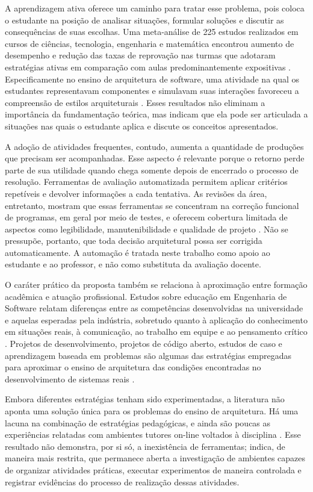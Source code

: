 A aprendizagem ativa oferece um caminho para tratar esse problema, pois coloca
o estudante na posição de analisar situações, formular soluções e discutir as
consequências de suas escolhas. Uma meta-análise de 225 estudos realizados em
cursos de ciências, tecnologia, engenharia e matemática encontrou aumento de
desempenho e redução das taxas de reprovação nas turmas que adotaram estratégias
ativas em comparação com aulas predominantemente expositivas
\cite{freeman_active_2014}. Especificamente no ensino de arquitetura de
software, uma atividade na qual os estudantes representavam componentes e
simulavam suas interações favoreceu a compreensão de estilos arquiteturais
\cite{georgas_supporting_2013}. Esses resultados não eliminam a importância da
fundamentação teórica, mas indicam que ela pode ser articulada a situações nas
quais o estudante aplica e discute os conceitos apresentados.

A adoção de atividades frequentes, contudo, aumenta a quantidade de produções
que precisam ser acompanhadas. Esse aspecto é relevante porque o retorno perde
parte de sua utilidade quando chega somente depois de encerrado o processo de
resolução. Ferramentas de avaliação automatizada permitem aplicar critérios
repetíveis e devolver informações a cada tentativa. As revisões da área,
entretanto, mostram que essas ferramentas se concentram na correção funcional
de programas, em geral por meio de testes, e oferecem cobertura limitada de
aspectos como legibilidade, manutenibilidade e qualidade de projeto
\cite{keuning_feedback_2018,messer_grading_2024}. Não se pressupõe, portanto,
que toda decisão arquitetural possa ser corrigida automaticamente. A automação
é tratada neste trabalho como apoio ao estudante e ao professor, e não como
substituta da avaliação docente.

O caráter prático da proposta também se relaciona à aproximação entre formação
acadêmica e atuação profissional. Estudos sobre educação em Engenharia de
Software relatam diferenças entre as competências desenvolvidas na universidade
e aquelas esperadas pela indústria, sobretudo quanto à aplicação do
conhecimento em situações reais, à comunicação, ao trabalho em equipe e ao
pensamento crítico \cite{garousi_closing_2020}. Projetos de desenvolvimento,
projetos de código aberto, estudos de caso e aprendizagem baseada em problemas
são algumas das estratégias empregadas para aproximar o ensino de arquitetura
das condições encontradas no desenvolvimento de sistemas reais
\cite{pantoja_training_2024}.

Embora diferentes estratégias tenham sido experimentadas, a literatura não
aponta uma solução única para os problemas do ensino de arquitetura. Há uma
lacuna na combinação de estratégias pedagógicas, e ainda são poucas as
experiências relatadas com ambientes tutores on-line voltados à disciplina
\cite{pantoja_training_2024}. Esse resultado não demonstra, por si só, a
inexistência de ferramentas; indica, de maneira mais restrita, que permanece
aberta a investigação de ambientes capazes de organizar atividades práticas,
executar experimentos de maneira controlada e registrar evidências do processo
de realização dessas atividades.

